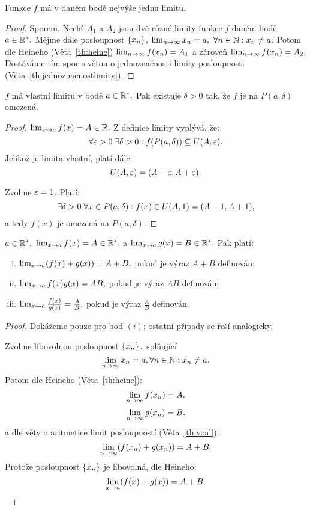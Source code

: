 \begin{theorem}
    Funkce $f$ má v daném bodě nejvýše jednu limitu.
\end{theorem}

\begin{proof}
    Sporem. Nechť $A_1$ a $A_2$ jsou dvě různé limity funkce $f$ daném bodě 
    $a \in \mathbb{R}^*.$  Mějme dále posloupnost $\left\{x_n\right\}$, $\lim_{n\to\infty} x_n = a,$
    $\forall n \in \mathbb{N}: x_n \neq a.$ Potom dle Heineho (Věta~\ref{th:heine})
    $\lim_{n\to\infty} f(x_n) = A_1$ a zároveň $\lim_{n\to\infty} f(x_n) = A_2.$
    Dostáváme tím spor s větou o jednoznačnosti limity posloupnosti 
    (Věta~\ref{th:jednoznacnostlimity}).
\end{proof}

\begin{theorem}
    \Necht $f$ má vlastní limitu v bodě $a\in\mathbb{R}^*.$ Pak existuje $\delta > 0$
    tak, že $f$ je na $P(a,\delta)$ omezená.
\end{theorem}

\begin{proof}
    \Necht $\lim_{x \to a} f(x) = A \in \mathbb{R}.$ Z definice limity vyplývá, že:
    $$\forall \varepsilon > 0 \; \exists \delta > 0: f(P(a, \delta)) \subseteq U(A, \varepsilon).$$
    Jelikož je limita vlastní, platí dále:
    $$U(A, \varepsilon) = (A-\varepsilon, A + \varepsilon).$$

    Zvolme $\varepsilon = 1$. Platí:
    $$\exists \delta > 0 \; \forall x \in P(a,\delta): f(x) \in U(A,1) = (A - 1, A+1),$$
    a tedy $f(x)$ je omezená na $P(a, \delta).$
\end{proof}

\begin{theorem}
    \label{th:voalf}
    \Necht $a \in \mathbb{R}^*,$ $\lim_{x \to a} f(x) = A \in \mathbb{R}^*,$ a $\lim_{x \to a}
    g(x) = B \in \mathbb{R}^*.$ Pak platí:
    \begin{enumerate}[i.]
        \item $\lim_{x \to a} (f(x) + g(x)) = A+B,$ pokud je výraz $A+B$ definován;
        \item $\lim_{x \to a} f(x)g(x) = AB,$ pokud je výraz $AB$ definován;
        \item $\lim_{x \to a} \frac{f(x)}{g(x)} = \frac{A}{B},$ pokud je výraz 
            $\frac{A}{B}$ definován.
    \end{enumerate}
\end{theorem}

\begin{proof}
    Dokážeme pouze pro bod $(i)$; ostatní případy se řeší analogicky.

    Zvolme libovolnou posloupnost $\left\{x_n\right\},$ splňující
    $$\lim_{n\to\infty} x_n = a, \forall n \in \mathbb{N}: x_n \neq a.$$
    Potom dle Heineho (Věta~\ref{th:heine}):
    $$\lim_{n\to\infty} f(x_n) = A,$$
    $$\lim_{n\to\infty} g(x_n) = B.$$
    a dle věty o aritmetice limit posloupností (Věta~\ref{th:voal}):
    $$\lim_{n\to\infty} (f(x_n) + g(x_n)) = A + B.$$
    Protože posloupnost $\left\{x_n\right\}$ je libovolná, dle Heineho:
    $$\lim_{x \to a} (f(x) + g(x)) = A+B.$$
\end{proof}

